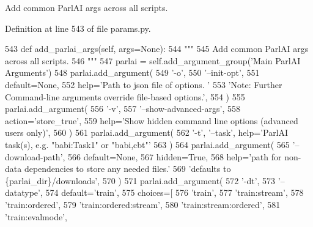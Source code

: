 \begin{DoxyVerb}Add common ParlAI args across all scripts.
\end{DoxyVerb}
 

Definition at line 543 of file params.\+py.


\begin{DoxyCode}
543     \textcolor{keyword}{def }add\_parlai\_args(self, args=None):
544         \textcolor{stringliteral}{"""}
545 \textcolor{stringliteral}{        Add common ParlAI args across all scripts.}
546 \textcolor{stringliteral}{        """}
547         parlai = self.add\_argument\_group(\textcolor{stringliteral}{'Main ParlAI Arguments'})
548         parlai.add\_argument(
549             \textcolor{stringliteral}{'-o'},
550             \textcolor{stringliteral}{'--init-opt'},
551             default=\textcolor{keywordtype}{None},
552             help=\textcolor{stringliteral}{'Path to json file of options. '}
553             \textcolor{stringliteral}{'Note: Further Command-line arguments override file-based options.'},
554         )
555         parlai.add\_argument(
556             \textcolor{stringliteral}{'-v'},
557             \textcolor{stringliteral}{'--show-advanced-args'},
558             action=\textcolor{stringliteral}{'store\_true'},
559             help=\textcolor{stringliteral}{'Show hidden command line options (advanced users only)'},
560         )
561         parlai.add\_argument(
562             \textcolor{stringliteral}{'-t'}, \textcolor{stringliteral}{'--task'}, help=\textcolor{stringliteral}{'ParlAI task(s), e.g. "babi:Task1" or "babi,cbt"'}
563         )
564         parlai.add\_argument(
565             \textcolor{stringliteral}{'--download-path'},
566             default=\textcolor{keywordtype}{None},
567             hidden=\textcolor{keyword}{True},
568             help=\textcolor{stringliteral}{'path for non-data dependencies to store any needed files.'}
569             \textcolor{stringliteral}{'defaults to \{parlai\_dir\}/downloads'},
570         )
571         parlai.add\_argument(
572             \textcolor{stringliteral}{'-dt'},
573             \textcolor{stringliteral}{'--datatype'},
574             default=\textcolor{stringliteral}{'train'},
575             choices=[
576                 \textcolor{stringliteral}{'train'},
577                 \textcolor{stringliteral}{'train:stream'},
578                 \textcolor{stringliteral}{'train:ordered'},
579                 \textcolor{stringliteral}{'train:ordered:stream'},
580                 \textcolor{stringliteral}{'train:stream:ordered'},
581                 \textcolor{stringliteral}{'train:evalmode'},

\end{DoxyCode}
